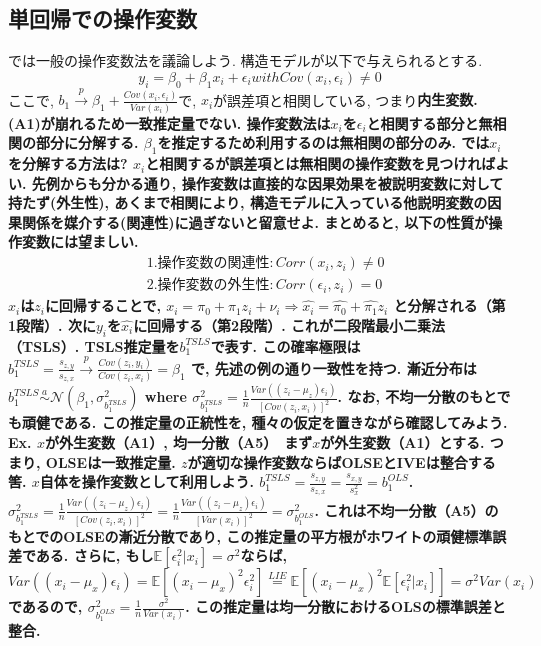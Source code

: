 \documentclass[paper=a4paper,fontsize=10pt]{jlreq}
\begin{document}
\subsection{単回帰での操作変数}
では一般の操作変数法を議論しよう. 構造モデルが以下で与えられるとする.
\begin{equation*}
  y_i = \beta_0 + \beta_1 x_i + \epsilon_i　with　Cov(x_i, \epsilon_i) \neq 0
\end{equation*}
ここで, $b_1 \overset{p}{\to} \beta_1 + \frac{Cov(x_i, \epsilon_i)}{Var(x_i)}$で, $x_i$が誤差項と相関している, つまり\rmfamily\mcfamily\bfseries{内生変数}\mdseries . (A1)が崩れるため一致推定量でない. 操作変数法は$x_i$を$\epsilon_i$と相関する部分と無相関の部分に分解する. $\beta_1$を推定するため利用するのは\rmfamily\mcfamily\bfseries{無相関の部分のみ}\mdseries . では$x_i$を分解する方法は? $x_i$と相関するが誤差項とは無相関の操作変数を見つければよい. 先例からも分かる通り, 操作変数は直接的な因果効果を被説明変数に対して持たず(外生性), あくまで相関により, 構造モデルに入っている他説明変数の因果関係を媒介する(関連性)に過ぎないと留意せよ. まとめると, 以下の性質が操作変数には望ましい.
\begin{align*}
  &1. 操作変数の関連性:　Corr(x_i , z_i ) \neq 0\\
  &2. 操作変数の外生性:　Corr(\epsilon_i , z_i ) = 0
\end{align*}
$x_i$は$z_i$に回帰することで, $x_i = \pi_0 + \pi_1 z_i + \nu_i ⇒ \hat{x_i} = \hat{\pi_0} + \hat{\pi_1} z_i$ と分解される（第1段階）. 次に$y_i$を$\hat{x_i}$に回帰する（第2段階）. これが\rmfamily\mcfamily\bfseries{二段階最小二乗法（TSLS）}\mdseries . TSLS推定量を$b_1^{TSLS}$で表す. この確率極限は$b_1^{TSLS} = \frac{s_{z,y}}{s_{z,x}} \overset{p}{\to} \frac{Cov(z_i, y_i)}{Cov(z_i, x_i)} = \beta_1$ で, 先述の例の通り一致性を持つ. 漸近分布は$b_1^{TSLS} \overset{a}{\sim} \mathcal{N}({\beta_1}, \sigma_{b_1^{TSLS}}^2)$ where $\sigma_{b_1^{TSLS}}^2 = \frac{1}{n}\frac{Var((z_i - \mu_z)\epsilon_i)}{[Cov(z_i, x_i)]^2}$. なお, 不均一分散のもとでも頑健である. この推定量の正統性を, 種々の仮定を置きながら確認してみよう.\\

\rmfamily\mcfamily\bfseries{Ex. $x$が外生変数（A1）, 均一分散（A5）}\mdseries　まず$x$が外生変数（A1）とする. つまり, OLSEは一致推定量. $z$が適切な操作変数ならばOLSEとIVEは整合する筈. $x$自体を操作変数として利用しよう. $b_1^{TSLS} = \frac{s_{z,y}}{s_{z,x}} = \frac{s_{x,y}}{s^{2}_{x}} = b_1^{OLS}$. $\sigma_{b_1^{TSLS}}^2 = \frac{1}{n}\frac{Var((z_i - \mu_z)\epsilon_i)}{[Cov(z_i, x_i)]^2} = \frac{1}{n}\frac{Var((z_i - \mu_z)\epsilon_i)}{[Var(x_i)]^2} = \sigma_{b_1^{OLS}}^2$. これは不均一分散（A5）のもとでのOLSEの漸近分散であり, この推定量の平方根がホワイトの頑健標準誤差である. さらに, もし$\mathbb{E}[\epsilon_i^2 | x_i] = \sigma^2$ならば, $Var((x_i - \mu_x)\epsilon_i) = \mathbb{E}[(x_i - \mu_x)^2\epsilon_i^2] \overset{LIE}{=} \mathbb{E}[(x_i - \mu_x)^2\mathbb{E}[\epsilon_i^2 | x_i]] = \sigma^2 Var(x_i)$であるので, $\sigma_{b_1^{OLS}}^2 = \frac{1}{n}\frac{\sigma^2}{Var(x_i)}$. この推定量は均一分散におけるOLSの標準誤差と整合.\\
\end{document}
